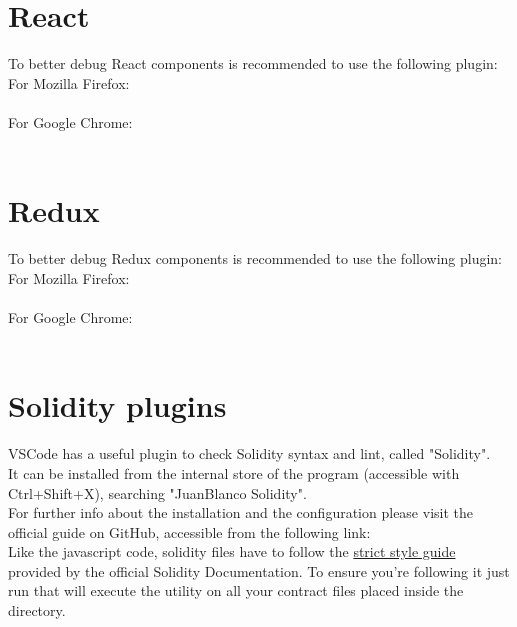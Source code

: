 \documentclass[ManualeSviluppatore.tex]{subfiles}
\begin{document}
\section{React}
To better debug React components is recommended to use the following plugin: \\
For Mozilla Firefox: \\
 \\
For Google Chrome: \\
 \\

\section{Redux}
To better debug Redux components is recommended to use the following plugin: \\
For Mozilla Firefox: \\
 \\
For Google Chrome: \\
 \\

\section{Solidity plugins}
VSCode has a useful plugin to check Solidity syntax and lint, called "Solidity".\\
It can be installed from the internal store of the program (accessible with Ctrl+Shift+X), searching "JuanBlanco Solidity". \\
For further info about the installation and the configuration please visit the official guide on GitHub, accessible from the following link:
\\
Like the javascript code, solidity files have to follow the \href{https://solidity.readthedocs.io/en/v0.3.1/style-guide.html}{strict style guide} provided by the official Solidity Documentation. To ensure you're following it just run  that will execute the  utility on all your contract files placed inside the  directory.
\end{document}
